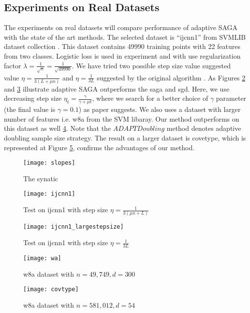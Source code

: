 \documentclass{article}
\begin{document}
\subsection{Experiments on Real Datasets}
The experiments on real datasets will compare performance of adaptive SAGA with
the state of the art methods.
 The selected dataset is ``ijcnn1'' from SVMLIB
 dataset collection \cite{REF08a}. This dataset contains 49990 training points
 with 22 features from two classes. Logistic loss is used in experiment and with
 use regularization factor $\lambda = \frac{1}{\sqrt{n}} =
 \frac{1}{\sqrt{49990}}$. We have tried two possible step size value suggested
 value $\eta = \frac{1}{3(L+\mu n )}$ and $\eta = \frac{1}{3L}$ suggested by
 the original algorithm \cite{defazio2014saga}. As Figures \ref{fig:ijcnn1} and 
 \ref{fig:ijcnn1_large} illustrate adaptive SAGA outperforms the saga and sgd. 
 Here, we use decreasing step size $\eta_t = \frac{\gamma}{\gamma+\mu t}$, where
 we search for a better choice of $\gamma$ parameter (the final value is $\gamma
 = 0.1$) as paper \cite{bottou2010large} suggests. 
 We also uses a dataset with larger number of features i.e. w8a from the SVM
 libaray. Our method outperforms on this dataset as well \ref{fig:wa}. Note that
 the $ADAPTDoubling$ method denotes adaptive doubling sample size strategy. The
 result on a larger dataset is covetype, which is represented at Figure
 \ref{fig:covtype}, confirms the advantages of our method. 
 \begin{figure}
\center
\texttt{[image: slopes]} 
\caption{The synatic }
\label{fig:slopes}
\end{figure}

 \begin{figure}
\center
\texttt{[image: ijcnn1]} 
\caption{Test on ijcnn1 with step size $\eta = \frac{1}{3(\mu n + L)}$}
\label{fig:ijcnn1}
\end{figure}
\begin{figure}
\center
\texttt{[image: ijcnn1\_largestepsize]} 
\caption{Test on ijcnn1 with step size $\eta = \frac{1}{3L}$}
\label{fig:ijcnn1_large}
\end{figure}
\begin{figure}
\center
\texttt{[image: wa]} 
\caption{w8a dataset with $n = 49,749, d = 300$}
\label{fig:wa}
\end{figure}
\begin{figure}
\center
\texttt{[image: covtype]} 
\caption{w8a dataset with $n = 581,012, d = 54$}
\label{fig:covtype}
\end{figure}



\end{document}
